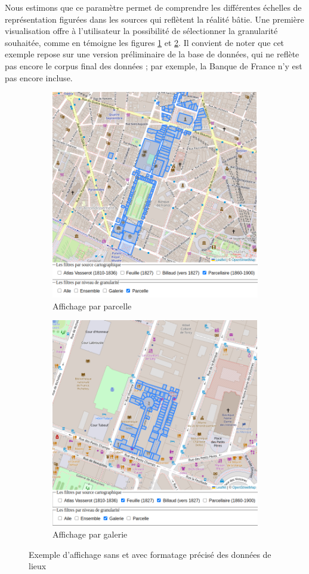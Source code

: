 Nous estimons que ce paramètre permet de comprendre les différentes échelles de représentation figurées dans les sources qui reflètent la réalité bâtie. Une première visualisation offre à l'utilisateur la possibilité de sélectionner la granularité souhaitée, comme en témoigne les figures \ref{fig:gran-parcelle} et \ref{fig:gran-galerie}.  Il convient de noter que cet exemple repose sur une version préliminaire de la base de données, qui ne reflète pas encore le corpus final des données ; par exemple, la Banque de France n'y est pas encore incluse. 
\begin{figure}[h!]
    \begin{subfigure}{.5\textwidth}
      \centering
    \includegraphics[width=.7\linewidth]{images/gran-parcelle.png}
    \caption{Affichage par parcelle}
    \label{fig:gran-parcelle}
    \end{subfigure}
    \begin{subfigure}{.5\textwidth}
      \centering
      \includegraphics[width=0.7\linewidth]{images/gran-galerie.png}
    \caption{Affichage par galerie}
    \label{fig:gran-galerie}
    \end{subfigure}
    \caption{Exemple d'affichage sans et avec formatage précisé des données de lieux}
\label{fig:granularité}
\end{figure}

